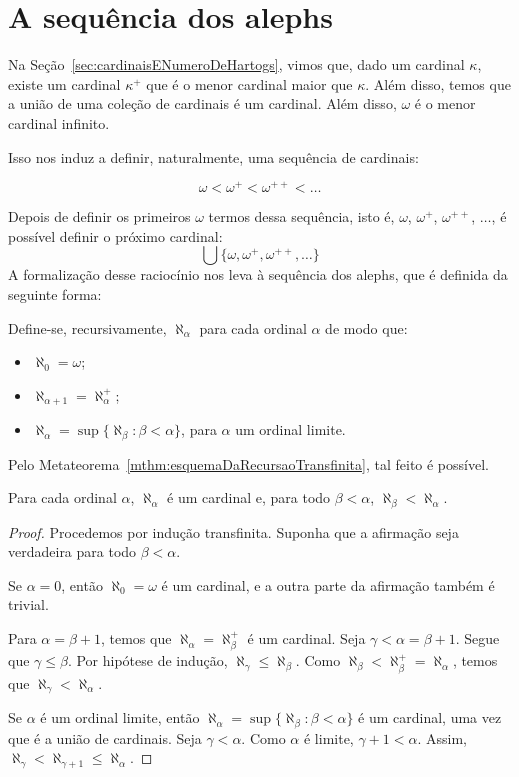 \section{A sequência dos alephs}\label{sec:sequenciaDosAlephs}
Na Seção~\ref{sec:cardinaisENumeroDeHartogs}, vimos que, dado um cardinal $\kappa$, existe um cardinal $\kappa^+$ que é o menor cardinal maior que $\kappa$.
Além disso, temos que a união de uma coleção de cardinais é um cardinal.
Além disso, $\omega$ é o menor cardinal infinito.

Isso nos induz a definir, naturalmente, uma sequência de cardinais:

\[
    \omega<\omega^+<\omega^{++}<\ldots
\]

Depois de definir os primeiros $\omega$ termos dessa sequência, isto é, $\omega$, $\omega^+$, $\omega^{++}$, $\ldots$, é possível definir o próximo cardinal:
\[
    \bigcup\{\omega, \omega^+, \omega^{++}, \ldots\}
\]
A formalização desse raciocínio nos leva à sequência dos alephs, que é definida da seguinte forma:
\begin{definition}\label{def:sequenciaDosAlephs}
    Define-se, recursivamente, $\aleph_\alpha$ para cada ordinal $\alpha$ de modo que:
    
    \begin{itemize}
        \item $\aleph_0 = \omega$;
        \item $\aleph_{\alpha+1} = \aleph_\alpha^+$;
        \item $\aleph_\alpha = \sup\{\aleph_\beta : \beta < \alpha\}$, para $\alpha$ um ordinal limite.
    \end{itemize}
\end{definition}
Pelo Metateorema~\ref{mthm:esquemaDaRecursaoTransfinita}, tal feito é possível.

\begin{lemma}\label{lem:propriedadesBasicasDosAlephs}
    Para cada ordinal $\alpha$, $\aleph_\alpha$ é um cardinal e, para todo $\beta<\alpha$, $\aleph_\beta < \aleph_\alpha$.
\end{lemma}
\begin{proof}
Procedemos por indução transfinita.
Suponha que a afirmação seja verdadeira para todo $\beta<\alpha$.

Se $\alpha=0$, então $\aleph_0 = \omega$ é um cardinal, e a outra parte da afirmação também é trivial.

Para $\alpha = \beta + 1$, temos que $\aleph_\alpha = \aleph_\beta^+$ é um cardinal.
Seja $\gamma < \alpha=\beta+1$.
Segue que $\gamma \leq \beta$.
Por hipótese de indução, $\aleph_\gamma \leq \aleph_\beta$.
Como $\aleph_\beta < \aleph_\beta^+ = \aleph_\alpha$, temos que $\aleph_\gamma < \aleph_\alpha$.

Se $\alpha$ é um ordinal limite, então $\aleph_\alpha = \sup\{\aleph_\beta : \beta < \alpha\}$ é um cardinal, uma vez que é a união de cardinais.
Seja $\gamma < \alpha$.
Como $\alpha$ é limite, $\gamma+1<\alpha$.
Assim, $\aleph_\gamma < \aleph_{\gamma+1} \leq \aleph_\alpha$.
\end{proof}

